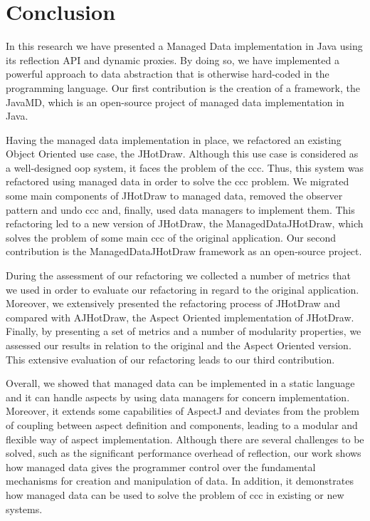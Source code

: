 
\chapter{Conclusion}\label{Conclusion}
In this research we have presented a Managed Data implementation in Java using its reflection API and dynamic proxies.
By doing so, we have implemented a powerful approach to data abstraction that is otherwise hard-coded in the programming language.
Our first contribution is the creation of a framework, the JavaMD, which is an open-source project of managed data implementation in Java.

Having the managed data implementation in place, we refactored an existing Object Oriented use case, the JHotDraw.
Although this use case is considered as a well-designed \ac{oop} system, it faces the problem of the \ac{ccc}.
Thus, this system was refactored using managed data in order to solve the \ac{ccc} problem.
We migrated some main components of JHotDraw to managed data, removed the observer pattern and undo \ac{ccc} and, finally, used data managers to implement them.
This refactoring led to a new version of JHotDraw, the ManagedDataJHotDraw, which solves the problem of some main \ac{ccc} of the original application.
Our second contribution is the ManagedDataJHotDraw framework as an open-source project.

During the assessment of our refactoring we collected a number of metrics that we used in order to evaluate our refactoring in regard to the original application.
Moreover, we extensively presented the refactoring process of JHotDraw and compared with AJHotDraw, the Aspect Oriented implementation of JHotDraw.
Finally, by presenting a set of metrics and a number of modularity properties, we assessed our results in relation to the original and the Aspect Oriented version.
This extensive evaluation of our refactoring leads to our third contribution.

Overall, we showed that managed data can be implemented in a static language and it can handle aspects by using data managers for concern implementation.
Moreover, it extends some capabilities of AspectJ and deviates from the problem of coupling between aspect definition and components, leading to a modular and flexible way of aspect implementation.
Although there are several challenges to be solved, such as the significant performance overhead of reflection, our work shows how managed data gives the programmer control over the fundamental mechanisms for creation and manipulation of data.
In addition, it demonstrates how managed data can be used to solve the problem of \ac{ccc} in existing or new systems.
